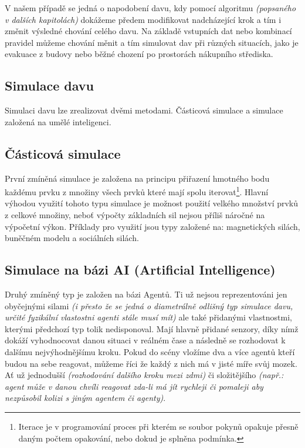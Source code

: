 \documentclass[czech,public,dept460,male,cpdeclaration]{diploma}
\begin{document}
V našem případě se jedná o napodobení davu, kdy pomocí algoritmu \textit{(popsaného v dalších kapitolách)} dokážeme předem modifikovat nadcházející krok a tím i změnit výsledné chování celého davu. Na základě vstupních dat nebo kombinací pravidel můžeme chování měnit a tím simulovat dav při různých situacích, jako je evakuace z budovy nebo běžné chození po prostorách nákupního střediska.

\subsection{Simulace davu}
Simulaci davu lze zrealizovat dvěmi metodami. Částicová simulace a simulace založená na umělé inteligenci. \cite{linkToBachelor1}

\subsection{Částicová simulace}
První zmíněná simulace je založena na principu přiřazení hmotného bodu každému prvku z množiny všech prvků které mají spolu iterovat\footnote{Iterace je v programování proces při kterém se soubor pokynů opakuje přesně daným počtem opakování, nebo dokud je splněna podmínka.\cite{linkToIteration}}. Hlavní výhodou využití tohoto typu simulace je možnost použití velkého množství prvků z celkové množiny, neboť výpočty základních sil nejsou příliš náročné na výpočetní výkon. Příklady pro využití jsou typy založené na: magnetických silách, buněčném modelu a sociálních silách. \cite{linkToBachelor1}

\subsection{Simulace na bázi AI (Artificial Intelligence)}\label{sec:simulace-na-bazi-ai-artificial-intelligence}
Druhý zmíněný typ je založen na bázi Agentů. Ti už nejsou reprezentováni jen obyčejnými silami \textit{(i přesto že se jedná o diametrálně odlišný typ simulace davu, určité fyzikální vlastostni agenti stále musí mít)} ale také přidanými vlastnostmi, kterými předchozí typ tolik nedisponoval. Mají hlavně přidané senzory, díky nímž dokáží vyhodnocovat danou situaci v reálném čase a následně se rozhodovat k dalšímu nejvýhodnějšímu kroku. Pokud do scény vložíme dva a více agentů kteří budou na sebe reagovat, můžeme říci že každý z nich má v jisté míře svůj mozek. Ať už jednodušší \textit{(rozhodování dalšího kroku mezi zdmi)} či složitějšího \textit{(např.: agent může v danou chvíli reagovat zda-li má jít rychleji či pomaleji aby nezpůsobil kolizi s jiným agentem či agenty)}.
\end{document}
